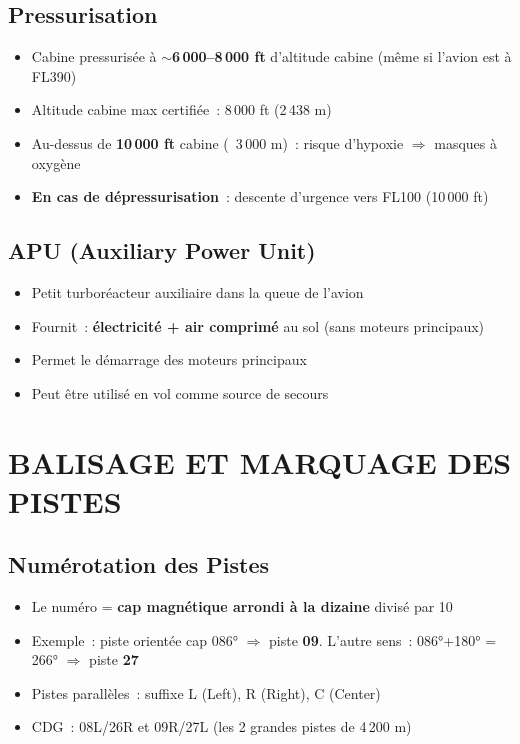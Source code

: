 \subsection{Pressurisation}
\begin{itemize}[nosep]
\item Cabine pressurisée à $\sim$\textbf{6\,000--8\,000 ft} d'altitude cabine (même si l'avion est à FL390)
\item Altitude cabine max certifiée~: 8\,000 ft (2\,438 m)
\item Au-dessus de \textbf{10\,000 ft} cabine (~3\,000 m)~: risque d'hypoxie $\Rightarrow$ masques à oxygène
\item \textbf{En cas de dépressurisation}~: descente d'urgence vers FL100 (10\,000 ft)
\end{itemize}

\subsection{APU (Auxiliary Power Unit)}
\begin{itemize}[nosep]
\item Petit turboréacteur auxiliaire dans la queue de l'avion
\item Fournit~: \textbf{électricité + air comprimé} au sol (sans moteurs principaux)
\item Permet le démarrage des moteurs principaux
\item Peut être utilisé en vol comme source de secours
\end{itemize}

\section{BALISAGE ET MARQUAGE DES PISTES}

\subsection{Numérotation des Pistes}
\begin{itemize}[nosep]
\item Le numéro = \textbf{cap magnétique arrondi à la dizaine} divisé par 10
\item Exemple~: piste orientée cap 086° $\Rightarrow$ piste \textbf{09}. L'autre sens~: 086°+180° = 266° $\Rightarrow$ piste \textbf{27}
\item Pistes parallèles~: suffixe L (Left), R (Right), C (Center)
\item CDG~: 08L/26R et 09R/27L (les 2 grandes pistes de 4\,200 m)
\end{itemize}

